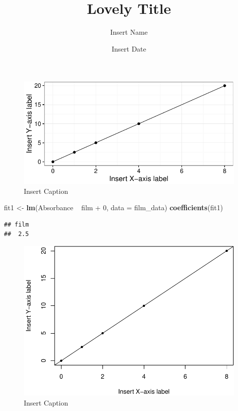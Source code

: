\documentclass[]{article}
\title{Lovely Title}
\author{Insert Name}
\date{Insert Date}
\newenvironment{Shaded}{\begin{snugshade}}{\end{snugshade}}
\newcommand{\KeywordTok}[1]{\textcolor[rgb]{0.13,0.29,0.53}{\textbf{{#1}}}}
\newcommand{\DataTypeTok}[1]{\textcolor[rgb]{0.13,0.29,0.53}{{#1}}}
\newcommand{\DecValTok}[1]{\textcolor[rgb]{0.00,0.00,0.81}{{#1}}}
\newcommand{\StringTok}[1]{\textcolor[rgb]{0.31,0.60,0.02}{{#1}}}
\newcommand{\NormalTok}[1]{{#1}}
\begin{document}
\maketitle

\begin{figure}[htbp]
\centering
\includegraphics{Beers_Law_files/figure-latex/absVfilm_ggplot-1.pdf}
\caption{Insert Caption}
\end{figure}

\begin{Shaded}
\begin{Highlighting}[]
\NormalTok{fit1 <-}\StringTok{ }\KeywordTok{lm}\NormalTok{(Absorbance ~}\StringTok{ }\NormalTok{film +}\StringTok{ }\DecValTok{0}\NormalTok{, }\DataTypeTok{data =} \NormalTok{film_data)}
\KeywordTok{coefficients}\NormalTok{(fit1)}
\end{Highlighting}
\end{Shaded}

\begin{verbatim}
## film 
##  2.5
\end{verbatim}

\begin{figure}[htbp]
\centering
\includegraphics{Beers_Law_files/figure-latex/absVfilm_base-1.pdf}
\caption{Insert Caption}
\end{figure}
\end{document}

